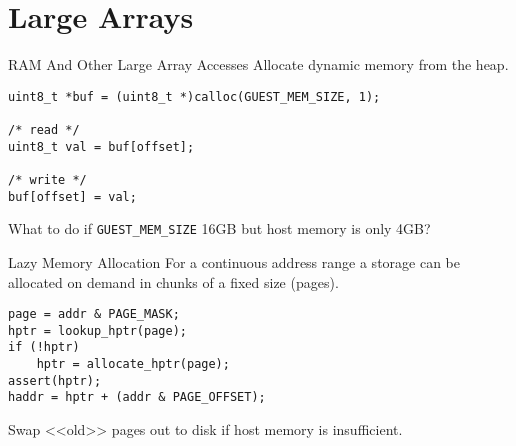 \section{Large Arrays}

\begin{frame}[fragile]{RAM And Other Large Array Accesses}
Allocate dynamic memory from the heap.
\vfill
\begin{lstlisting}
uint8_t *buf = (uint8_t *)calloc(GUEST_MEM_SIZE, 1);

/* read */
uint8_t val = buf[offset];

/* write */
buf[offset] = val;
\end{lstlisting}
\vfill\pause
What to do if \texttt{GUEST_MEM_SIZE} 16GB but host memory is only 4GB?
\end{frame}

\begin{frame}[fragile]{Lazy Memory Allocation}
For a continuous address range a storage can be allocated on demand in chunks
of a fixed size (pages).
\vfill
\begin{lstlisting}
page = addr & PAGE_MASK;
hptr = lookup_hptr(page);
if (!hptr)
    hptr = allocate_hptr(page);
assert(hptr);
haddr = hptr + (addr & PAGE_OFFSET);
\end{lstlisting}
\vfill
Swap <<old>> pages out to disk if host memory is insufficient.
\end{frame}

